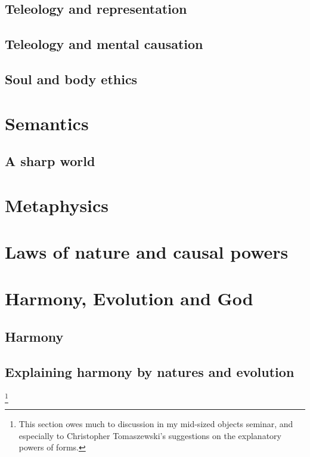 \section{Teleology and representation}
\section{Teleology and mental causation}
\section{Soul and body ethics}
\chaptertail 

\def\mychapter{VI}

\chapter{Semantics}\label{ch:semantics}
\section{A sharp world}
\chaptertail

\def\mychapter{VII}

\chapter{Metaphysics}\label{ch:metaphysics}
\chaptertail 

\def\mychapter{VIII}

\chapter{Laws of nature and causal powers}\label{ch:laws}
\chaptertail

\def\mychapter{IX}

\chapter{Harmony, Evolution and God}\label{ch:God}
\section{Harmony}
\section{Explaining harmony by natures and evolution}
\footnote{This section owes much to discussion in my mid-sized objects seminar, and especially to Christopher Tomaszewski's suggestions on the explanatory powers of forms.}

